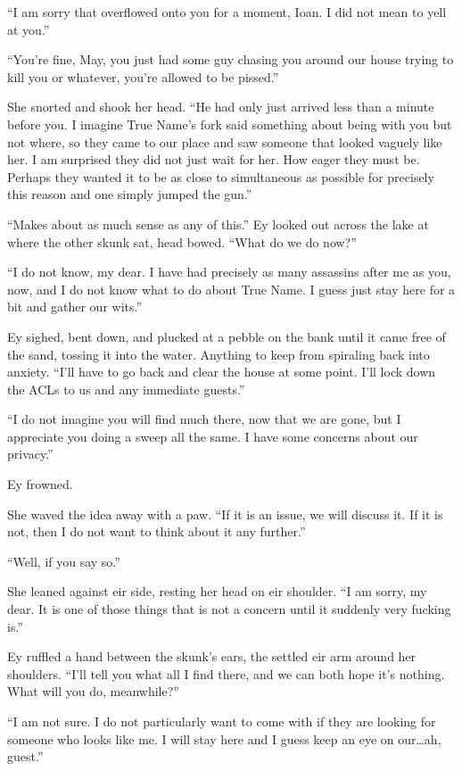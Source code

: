 ``I am sorry that overflowed onto you for a moment, Ioan. I did not mean to yell at you.''

``You're fine, May, you just had some guy chasing you around our house trying to kill you or whatever, you're allowed to be pissed.''

She snorted and shook her head. ``He had only just arrived less than a minute before you. I imagine True Name's fork said something about being with you but not where, so they came to our place and saw someone that looked vaguely like her. I am surprised they did not just wait for her. How eager they must be. Perhaps they wanted it to be as close to simultaneous as possible for precisely this reason and one simply jumped the gun.''

``Makes about as much sense as any of this.'' Ey looked out across the lake at where the other skunk sat, head bowed. ``What do we do now?''

``I do not know, my dear. I have had precisely as many assassins after me as you, now, and I do not know what to do about True Name. I guess just stay here for a bit and gather our wits.''

Ey sighed, bent down, and plucked at a pebble on the bank until it came free of the sand, tossing it into the water. Anything to keep from spiraling back into anxiety. ``I'll have to go back and clear the house at some point. I'll lock down the ACLs to us and any immediate guests.''

``I do not imagine you will find much there, now that we are gone, but I appreciate you doing a sweep all the same. I have some concerns about our privacy.''

Ey frowned.

She waved the idea away with a paw. ``If it is an issue, we will discuss it. If it is not, then I do not want to think about it any further.''

``Well, if you say so.''

She leaned against eir side, resting her head on eir shoulder. ``I am sorry, my dear. It is one of those things that is not a concern until it suddenly very fucking is.''

Ey ruffled a hand between the skunk's ears, the settled eir arm around her shoulders. ``I'll tell you what all I find there, and we can both hope it's nothing. What will you do, meanwhile?''

``I am not sure. I do not particularly want to come with if they are looking for someone who looks like me. I will stay here and I guess keep an eye on our\ldots ah, guest.''

